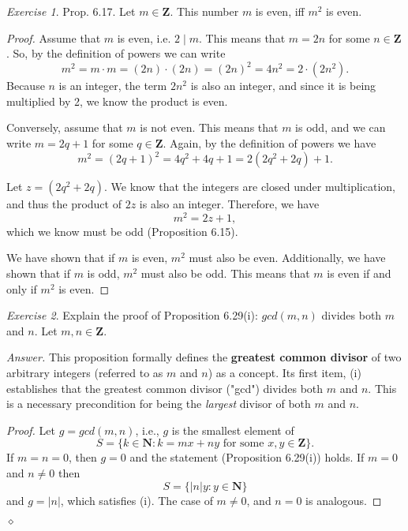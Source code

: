 \documentclass[12pt,oneside]{amsart}
\theoremstyle{remark}
\newtheorem{exer}{Exercise}
\newcommand{\bfN}{\mathbf{N}}
\newcommand{\bfZ}{\mathbf{Z}}
\newenvironment{answer}{\bigskip\noindent\emph{Answer.}}{\hfill$\diamond$\newline}
\begin{document}
%
%
%
%
\newpage
\begin{exer}
Prop. 6.17. Let $m \in \bfZ$. This number $m$ is even, iff $m^2$ is even.
\end{exer}

%
\begin{proof}
Assume that $m$ is even, i.e. $2 \mid m$. This means that $m = 2n$ for some $n \in \bfZ$. So, by the definition of powers we can write \[ m^2 = m \cdot m = (2n) \cdot (2n) = (2n)^2 = 4n^2 = 2 \cdot (2n^2). \] Because $n$ is an integer, the term $2n^2$ is also an integer, and since it is being multiplied by 2, we know the product is even.

Conversely, assume that $m$ is not even. This means that $m$ is odd, and we can write $m = 2q + 1$ for some $q \in \bfZ$. Again, by the definition of powers we have \[ m^2 = (2q + 1)^2 = 4q^2 + 4q + 1 = 2(2q^2 + 2q) + 1. \]

Let $z = (2q^2 + 2q)$. We know that the integers are closed under multiplication, and thus the product of $2z$ is also an integer. Therefore, we have \[ m^2 = 2z +1, \] which we know must be odd (Proposition 6.15).

We have shown that if $m$ is even, $m^2$ must also be even. Additionally, we have shown that if $m$ is odd, $m^2$ must also be odd. This means that $m$ is even if and only if $m^2$ is even.
\end{proof}

%
%
%
%
\newpage
\begin{exer}
Explain the proof of Proposition 6.29(i): $gcd(m, n)$ divides both $m$ and $n$. Let $m,n \in \bfZ$. %
\end{exer}

\begin{answer}
This proposition formally defines the \textbf{greatest common divisor} of two arbitrary integers (referred to as $m$ and $n$) as a concept. Its first item, (i) establishes that the greatest common divisor ("gcd") divides both $m$ and $n$. This is a necessary precondition for being the \emph{largest} divisor of both $m$ and $n$.
\begin{proof}
Let $g = gcd(m, n)$, i.e., $g$ is the smallest element of \[ S = \{k \in \bfN : k = mx + ny \text{ for some } x,y \in \bfZ \}. \] If $m = n = 0$, then $g = 0$ and the statement (Proposition 6.29(i)) holds. If $m = 0$ and $n \neq 0$ then \[ S = \{ |n|y : y \in \bfN \} \] and $g = |n|$, which satisfies (i). The case of $m \neq 0$, and $n = 0$ is analogous.
\end{proof}
\end{answer}
\end{document}
